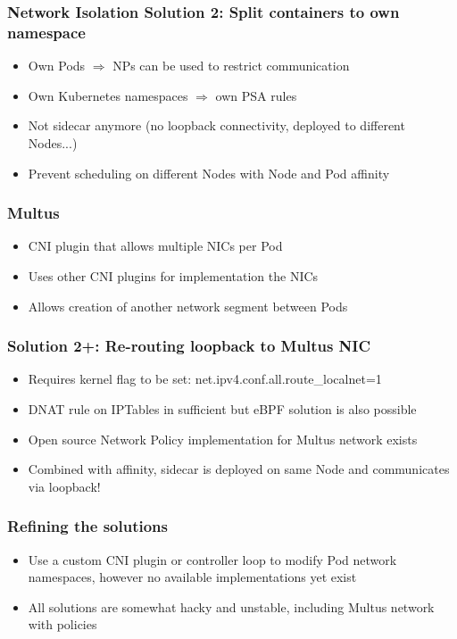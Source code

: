 \documentclass{beamer}
\begin{document}
\begin{frame}
  \frametitle{Network Isolation Solution 2: Split containers to own namespace}

  \begin{itemize}
    \item Own Pods $\Rightarrow$ NPs can be used to restrict communication
    \item Own Kubernetes namespaces $\Rightarrow$ own PSA rules
    \item Not sidecar anymore (no loopback connectivity, deployed to different Nodes...)
    \item Prevent scheduling on different Nodes with Node and Pod affinity
  \end{itemize}
  \end{frame}

\begin{frame}
\frametitle{Multus}

\begin{itemize}
  \item CNI plugin that allows multiple NICs per Pod
  \item Uses other CNI plugins for implementation the NICs
  \item Allows creation of another network segment between Pods
\end{itemize}
\end{frame}

\begin{frame}
\frametitle{Solution 2+: Re-routing loopback to Multus NIC}

\begin{itemize}
  \item Requires kernel flag to be set: net.ipv4.conf.all.route\_localnet=1
  \item DNAT rule on IPTables in sufficient but eBPF solution is also possible
  \item Open source Network Policy implementation for Multus network exists
  \item Combined with affinity, sidecar is deployed on same Node and communicates via loopback!
\end{itemize}
\end{frame}

\begin{frame}
\frametitle{Refining the solutions}

\begin{itemize}
  \item Use a custom CNI plugin or controller loop to modify Pod network namespaces, however no available implementations yet exist
  \item All solutions are somewhat hacky and unstable, including Multus network with policies
\end{itemize}
\end{frame}
\end{document}
